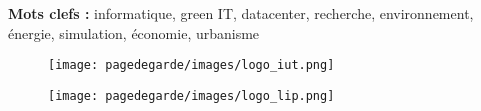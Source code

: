 \begin{spacing}{1}
	\textbf{Mots clefs :} informatique, green IT, datacenter, recherche, environnement, énergie, simulation, économie, urbanisme\\
	
	\begin{figure}[b]
		\begin{minipage}[c]{.48\linewidth}
			\center
			\texttt{[image: pagedegarde/images/logo\_iut.png]}
		\end{minipage} \hfill
		\begin{minipage}[c]{.48\linewidth}
			\center
			\texttt{[image: pagedegarde/images/logo\_lip.png]}
		\end{minipage}
	\end{figure}
\end{spacing}